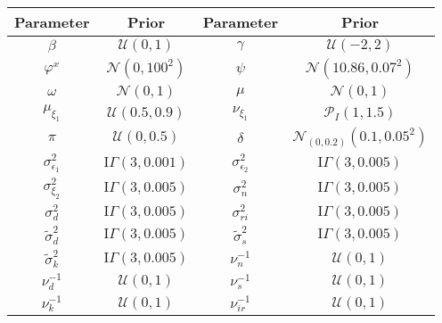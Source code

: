 \begin{tabular}{cccc}
	\hline \hline 
	Parameter & Prior & Parameter & Prior \\
	\hline
	$\beta$ & $\mathcal{U} (0,1)$ &
	$\gamma$ & $\mathcal{U} (-2,2)$ \\ [0.2em]
	$\varphi^x$ & $\mathcal{N} (0,100^2)$ & 
	$\psi$ & $\mathcal{N}(10.86,0.07^2)$ \\ [0.2em]
	$\omega$ & $\mathcal{N}(0,1)$ &
	$\mu$ & $\mathcal{N} (0,1)$ \\ [0.2em]
	$\mu_{\xi_1}$ & $\mathcal{U} (0.5,0.9)$ &
	$\nu_{\xi_1}$ & $\mathcal{P}_I (1,1.5)$ \\ [0.2em]
	$\pi$ & $\mathcal{U} (0,0.5)$ &
	$\delta$ & $\mathcal{N}_{(0,0.2)}(0.1,0.05^2)$ \\ [0.2em]
	$\sigma^2_{\epsilon_{1}}$ & $\text{I}\Gamma(3,0.001)$  &
	$\sigma^2_{\epsilon_{2}}$ & $\text{I}\Gamma(3,0.005)$ \\ [0.2em]
	$\sigma^2_{\xi_2}$ & $\text{I}\Gamma(3,0.005)$ &
	$\sigma^2_{n}$ & $\text{I}\Gamma(3,0.005)$ \\ [0.2em]
	$\sigma^2_{d}$ & $\text{I}\Gamma(3,0.005)$ &
	$\sigma^2_{ri}$ & $\text{I}\Gamma(3,0.005)$ \\ [0.2em]
	$\tilde{\sigma}^2_{d}$ & $\text{I}\Gamma(3,0.005)$ &
	$\tilde{\sigma}^2_{s}$ & $\text{I}\Gamma(3,0.005)$ \\ [0.2em]
	$\tilde{\sigma}^2_{k}$ & $\text{I}\Gamma(3,0.005)$ & 
	$\nu^{-1}_{n}$ & $\mathcal{U} (0,1)$ \\ [0.2em]
	$\nu^{-1}_{d}$ & $\mathcal{U} (0,1)$ &
	$\nu^{-1}_{s}$ & $\mathcal{U} (0,1)$ \\ [0.2em] 
	$\nu^{-1}_{k}$ & $\mathcal{U} (0,1)$ &
    $\nu^{-1}_{ir}$ & $\mathcal{U}(0,1)$ \\ [0.2em]
	\hline
\end{tabular}
